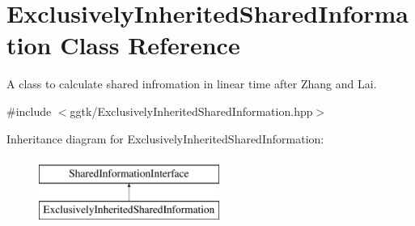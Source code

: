 \hypertarget{classExclusivelyInheritedSharedInformation}{}\section{Exclusively\+Inherited\+Shared\+Information Class Reference}
\label{classExclusivelyInheritedSharedInformation}


A class to calculate shared infromation in linear time after Zhang and Lai.  




{\ttfamily \#include $<$ggtk/\+Exclusively\+Inherited\+Shared\+Information.\+hpp$>$}

Inheritance diagram for Exclusively\+Inherited\+Shared\+Information\+:\begin{figure}[H]
\begin{center}
\leavevmode
\includegraphics[height=2.000000cm]{classExclusivelyInheritedSharedInformation}
\end{center}
\end{figure}
